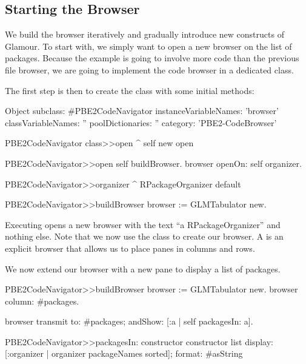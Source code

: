 \documentclass[a4paper,10pt,twoside]{book}
\begin{document}
\subsection{Starting the Browser}

We build the browser iteratively and gradually introduce new
constructs of Glamour. To start with, we simply want to open a new
browser on the list of packages. Because the example is going to
involve more code than the previous file browser, we are going to
implement the code browser in a dedicated class.

The first step is then to create the class with some initial methods:

\begin{code}{}
Object subclass: #PBE2CodeNavigator
  instanceVariableNames: 'browser'
  classVariableNames: ''
  poolDictionaries: ''
  category: 'PBE2-CodeBrowser'

PBE2CodeNavigator class>>open
  ^ self new open

PBE2CodeNavigator>>open
  self buildBrowser.
  browser openOn: self organizer.

PBE2CodeNavigator>>organizer
  ^ RPackageOrganizer default

PBE2CodeNavigator>>buildBrowser
  browser := GLMTabulator new.
\end{code}

Executing  opens a new browser with the text
``a RPackageOrganizer'' and nothing else. Note that we now use the  class to create our browser. A  is an explicit browser that allows us to place panes in columns and rows.


We now extend our browser with a new pane to display a list of packages.


\begin{code}{}
PBE2CodeNavigator>>buildBrowser
  browser := GLMTabulator new.
  browser
    column: #packages.

  browser transmit to: #packages; andShow: [:a | self packagesIn: a].

PBE2CodeNavigator>>packagesIn: constructor
  constructor list
    display: [:organizer | organizer packageNames sorted];
    format: #asString
\end{code}
\end{document}
